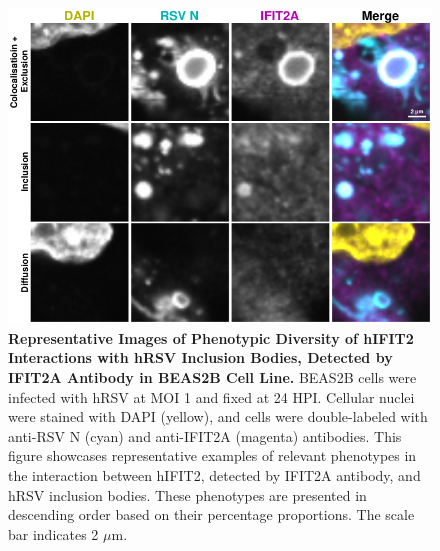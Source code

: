 \begin{figure}
    \centering
    \includegraphics[width=1\linewidth]{08. Chapter 3/Figs/02. Infection/02. IFIT2/01. IFIT2A/12. i2a beas2b.pdf} 
    \caption[Representative Images of Phenotypic Diversity of hIFIT2 Interactions with hRSV Inclusion Bodies, Detected by IFIT2A Antibody in BEAS2B Cell Line.]{\textbf{Representative Images of Phenotypic Diversity of hIFIT2 Interactions with hRSV Inclusion Bodies, Detected by IFIT2A Antibody in BEAS2B Cell Line.} BEAS2B cells were infected with hRSV at MOI 1 and fixed at 24 HPI. Cellular nuclei were stained with DAPI (yellow), and cells were double-labeled with anti-RSV N (cyan) and anti-IFIT2A (magenta) antibodies. This figure showcases representative examples of relevant phenotypes in the interaction between hIFIT2, detected by IFIT2A antibody, and hRSV inclusion bodies. These phenotypes are presented in descending order based on their percentage proportions. The scale bar indicates 2 \(\mu \mbox{m}\).}
    \label{fig:Representative Images of Phenotypic Diversity of hIFIT2 Interactions with hRSV Inclusion Bodies, Detected by IFIT2A Antibody in BEAS2B Cell Line}
\end{figure}

